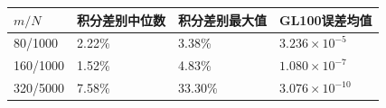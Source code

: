 \begin{tabular}{llll}\toprule
$m/N$ & 积分差别中位数 & 积分差别最大值 & GL100误差均值 \\ \midrule
80/1000 & 2.22\% & 3.38\% & $3.236\times10^{-5}$ \\
160/1000 & 1.52\% & 4.83\% & $1.080\times10^{-7}$ \\
320/5000 & 7.58\% & 33.30\% & $3.076\times10^{-10}$ \\
\bottomrule\end{tabular}
